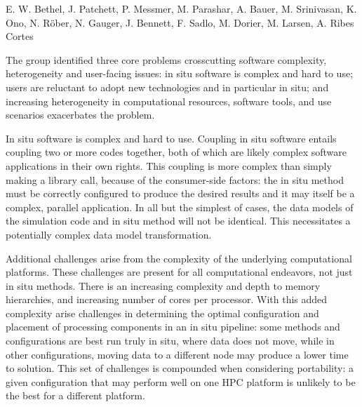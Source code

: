 
\license

 E. W. Bethel, J. Patchett, P. Messmer, M. Parashar, A. Bauer, M. Srinivasan, K. Ono, N. Röber, N. Gauger, J. Bennett, F. Sadlo, M. Dorier, M. Larsen, A. Ribes Cortes

\begin{refsection}

The group identified three core problems crosscutting software complexity, heterogeneity and user-facing issues: in situ software is complex and hard to use; users are reluctant to adopt new technologies and in particular in situ; and increasing heterogeneity in computational resources, software tools, and use scenarios exacerbates the problem. 

In situ software is complex and hard to use. 
Coupling in situ software entails coupling two or more codes together, both of which are likely complex software applications in their own rights. 
This coupling is more complex than simply making a library call, because of the consumer-side factors: the in situ method must be correctly configured to produce the desired results and it may itself be a complex, parallel application. 
In all but the simplest of cases, the data models of the simulation code and in situ method will not be identical.
This necessitates a potentially complex data model transformation.

Additional challenges arise from the complexity of the underlying computational platforms.
These challenges are present for all computational endeavors, not just in situ methods. 
There is an increasing complexity and depth to memory hierarchies, and increasing number of cores per processor. 
With this added complexity arise challenges in determining the optimal configuration and placement of processing components in an in situ pipeline: some methods and configurations are best run truly in situ, where data does not move, while in other configurations, moving data to a different node may produce a lower time to solution. 
This set of challenges is compounded when considering portability: a given configuration that may perform well on one HPC platform is unlikely to be the best for a different platform.


\end{refsection}
